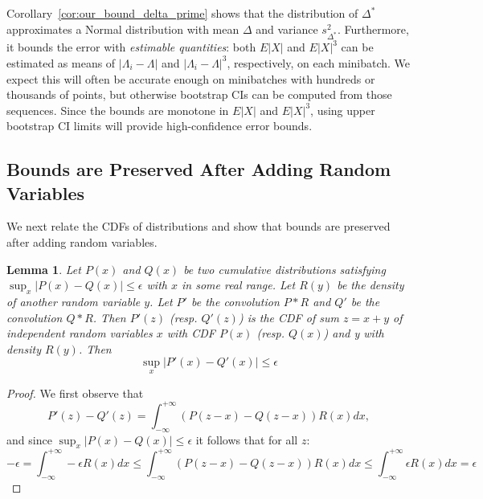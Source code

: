 \documentclass{article}
\newtheorem{lemma}{Lemma}
\begin{document}
Corollary~\ref{cor:our_bound_delta_prime} shows that the distribution of
$\Delta^*$ approximates a Normal distribution with mean $\Delta$ and variance
$s^2_{\Delta^*}$. Furthermore, it bounds the error with \emph{estimable
quantities}: both $E|X|$ and $E|X|^3$ can be estimated as means of $|\Lambda_i
- \Lambda|$ and $|\Lambda_i - \Lambda|^3$, respectively, on each minibatch. We
expect this will often be accurate enough on minibatches with hundreds or
thousands of points, but otherwise bootstrap CIs can be computed from those
sequences. Since the bounds are monotone in $E|X|$ and $E|X|^3$, using upper
bootstrap CI limits will provide high-confidence error bounds.



\subsection{Bounds are Preserved After Adding Random Variables}\label{ssec:preserve_bounds}

We next relate the CDFs of distributions and show that bounds are preserved
after adding random variables.

\begin{lemma}\label{lem:cdf_bounds}
Let $P(x)$ and $Q(x)$ be two cumulative distributions satisfying
$\sup_x|P(x)-Q(x)|\leq \epsilon$ with $x$ in some real range. Let $R(y)$ be the
{\em density} of another random variable $y$. Let $P'$ be the convolution $P*R$
and $Q'$ be the convolution $Q*R$. Then $P'(z)$ (resp. $Q'(z)$) is the CDF of
sum $z=x+y$ of independent random variables $x$ with CDF $P(x)$ (resp. $Q(x)$)
and y with density $R(y)$.  Then
\begin{equation}
    \sup_x|P'(x)-Q'(x)|\leq \epsilon
\end{equation}
\end{lemma}

\begin{proof}
We first observe that
\begin{equation}\label{eq:pdf_difference}
    P'(z) - Q'(z) = \int_{-\infty}^{+\infty}(P(z-x)-Q(z-x))R(x) dx,
\end{equation}
and since $\sup_x|P(x)-Q(x)|\leq \epsilon$ it follows that for all $z$:
\begin{equation}
-\epsilon = \int_{-\infty}^{+\infty} -\epsilon R(x) dx \leq \int_{-\infty}^{+\infty}(P(z-x)-Q(z-x))R(x) dx \leq \int_{-\infty}^{+\infty}\epsilon R(x) dx = \epsilon
\end{equation}
\end{proof}
\end{document}
